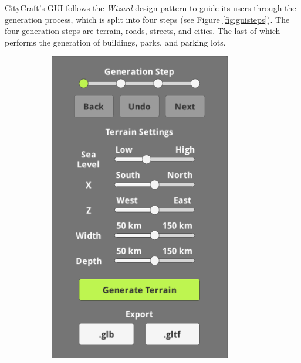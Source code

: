 CityCraft's GUI follows the \textit{Wizard} design pattern \cite{yer_a_wizard} to guide its users through the generation process, which is split into four steps (see Figure \ref{fig:guisteps}).
The four generation steps are terrain, roads, streets, and cities.
The last of which performs the generation of buildings, parks, and parking lots. 

\begin{figure}[H]
  \centering
  \begin{subfigure}[b]{0.24\textwidth}
    \includegraphics[width=\textwidth]{figure/results/gui1.png}

\end{subfigure}
\end{figure}
